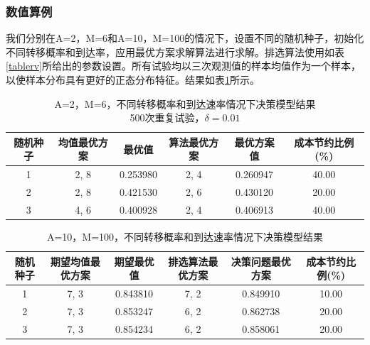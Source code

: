 \documentclass{article}
\begin{document}
\subsubsection{数值算例}
我们分别在A=2，M=6和A=10，M=100的情况下，设置不同的随机种子，初始化不同转移概率和到达率，应用最优方案求解算法进行求解。排选算法使用如表\ref{tablerv}所给出的参数设置。所有试验均以三次观测值的样本均值作为一个样本，以使样本分布具有更好的正态分布特征。结果如表\ref{a2m6rs}所示。
\begin{table}[H]
    \centering
    \caption{A=2，M=6，不同转移概率和到达速率情况下决策模型结果\\
    500次重复试验，$\delta = 0.01$}
    \begin{tabular}{ |c|c|c|c|c|c| } 
     \hline
     随机种子 & 均值最优方案 & 最优值 & 算法最优方案 & 最优方案值 & 成本节约比例(\%)\\ 
     \hline
     1 & 2, 8 & 0.253980 & 2, 4 & 0.260947 & 40.00 \\ 
     \hline
     2 & 2, 8 & 0.421530 & 2, 6 & 0.430120 & 20.00 \\ 
     \hline
     3 & 4, 6 & 0.400928 & 2, 4 & 0.406913 & 40.00 \\ 
     \hline
    \end{tabular}
    \label{a2m6rs}
\end{table}
\begin{table}[H]
    \centering
    \caption{A=10，M=100，不同转移概率和到达速率情况下决策模型结果}
    \begin{tabular}{ |c|c|c|c|c|c| } 
     \hline
     随机种子 & 期望均值最优方案 & 期望最优值 & 排选算法最优方案 & 决策问题最优方案 & 成本节约比例(\%)\\ 
     \hline
     1 & 7, 3 & 0.843810 & 7, 2 & 0.849910 & 10.00 \\ 
     \hline
     2 & 7, 3 & 0.853247 & 6, 2 & 0.862738 & 20.00 \\ 
     \hline
     3 & 7, 3 & 0.854234 & 6, 2 & 0.858061 & 20.00 \\ 
     \hline
    \end{tabular}
    \label{a10m100rs}
\end{table}

\end{document}
